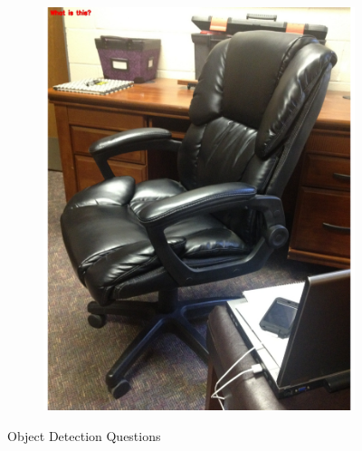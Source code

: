 \documentclass[sigconf]{acmart}
\begin{document}
\begin{figure}[hbp]
\begin{subfigure}[b]{0.4\columnwidth}
                \includegraphics[scale=0.3]{images/object_2.pdf}  
        \end{subfigure}%
        \caption{Object Detection Questions} 
        \label{fig:object}
\end{figure}
\end{document}
